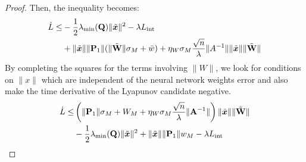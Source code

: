 \documentclass[11pt, a4paper]{article}
\newcommand{\xtilde}{\tilde{\bm{x}}}
\newcommand{\Wtilde}{\tilde{\mathbf{W}}}
\begin{document}
\begin{proof}
Then, the inequality becomes:
\begin{align}
    \dot{L} \le 
    & -\frac{1}{2}\lambda_{\min}(\mathbf{Q})\|\xtilde\|^2 - \lambda L_{\text{int}} \notag \\
    & + \|\xtilde\|\|\mathbf{P}_1\|(\|\Wtilde\| \sigma_{M} + \bar{w}) 
    + \eta_W \sigma_M \frac{\sqrt{n}}{\lambda}\|A^{-1}\|\|\xtilde\|\|\Wtilde\|
    \label{eq:Ldot_ineq_full}
\end{align}
By completing the squares for the terms involving $\|\hat{W}\|$, we look for conditions on $\|x\|$ which are independent of the neural network weights error and also make the time derivative of the Lyapunov candidate negative.
\begin{align*}
    \dot{L} \le &
    \left( \|\mathbf{P}_1\|\sigma_M + W_M + \eta_W\sigma_M \frac{\sqrt{n}}{\lambda} \|\mathbf{A}^{-1}\|\right) \|\xtilde\|  \|\Wtilde\| \notag \\
    & - \frac{1}{2}\lambda_{\min}(\mathbf{Q})\|\xtilde\|^2 
    + \|\xtilde\|\|\mathbf{P}_1\|w_M 
    - \lambda L_{\text{int}}
\end{align*}

\end{proof}
\end{document}
